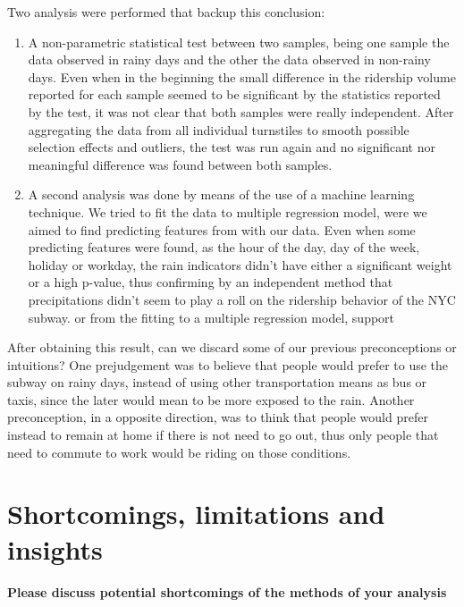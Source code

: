\documentclass[a4paper,12pt,english]{sphinxmanual}
\begin{document}
Two analysis were performed that backup this conclusion:
\begin{enumerate}
\item {} 
A non-parametric statistical test between two samples, being one sample the
data observed in rainy days and the other the data observed in non-rainy days.
Even when in the beginning the small difference in the ridership volume reported
for each sample seemed to be significant by the statistics reported by the test,
it was not clear that both samples were really independent. After aggregating the
data from all individual turnstiles to smooth possible selection effects and
outliers, the test was run again and no significant nor meaningful difference
was found between both samples.

\item {} 
A second analysis was done by means of the use of a machine learning technique.
We tried to fit the data to multiple regression model, were we aimed to find
predicting features from with our data. Even when some predicting features
were found, as the hour of the day, day of the week, holiday or workday,
the rain indicators didn't have either a significant weight or a high p-value,
thus confirming by an independent method that precipitations didn't seem to
play a roll on the ridership behavior of the NYC subway.
or from the fitting to a multiple regression model, support

\end{enumerate}

After obtaining this result, can we discard some of our previous preconceptions
or intuitions? One prejudgement was to believe that people would prefer to use
the subway on rainy days, instead of using other transportation means as bus or
taxis, since the later would mean to be more exposed to the rain. Another
preconception, in a opposite direction, was to think that people would
prefer instead to remain at home if there is not need to go out, thus only
people that need to commute to work would be riding on those conditions.


\section{Shortcomings, limitations and insights}
\label{section4:shortcomings-limitations-and-insights}
\textbf{Please discuss potential shortcomings of the methods of your analysis}
\end{document}
